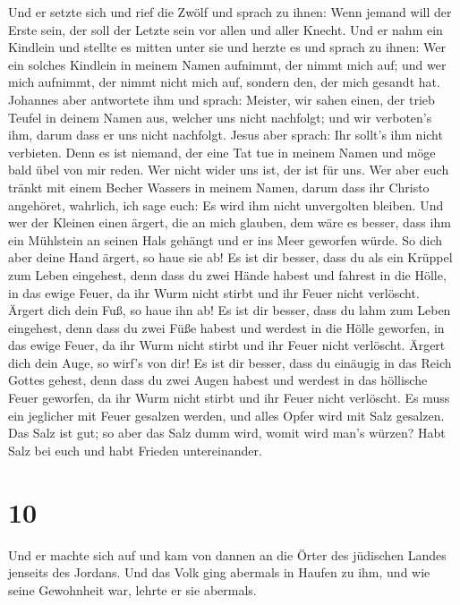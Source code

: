  Und er setzte sich und rief die Zwölf und sprach zu
ihnen: Wenn jemand will der Erste sein, der soll der Letzte sein vor
allen und aller Knecht.  Und er nahm ein Kindlein und
stellte es mitten unter sie und herzte es und sprach zu ihnen:
 Wer ein solches Kindlein in meinem Namen aufnimmt, der
nimmt mich auf; und wer mich aufnimmt, der nimmt nicht mich auf, sondern
den, der mich gesandt hat.  Johannes aber antwortete ihm
und sprach: Meister, wir sahen einen, der trieb Teufel in deinem Namen
aus, welcher uns nicht nachfolgt; und wir verboten's ihm, darum dass er
uns nicht nachfolgt.  Jesus aber sprach: Ihr sollt's ihm
nicht verbieten. Denn es ist niemand, der eine Tat tue in meinem Namen
und möge bald übel von mir reden.  Wer nicht wider uns
ist, der ist für uns.  Wer aber euch tränkt mit einem
Becher Wassers in meinem Namen, darum dass ihr Christo angehöret,
wahrlich, ich sage euch: Es wird ihm nicht unvergolten bleiben.
 Und wer der Kleinen einen ärgert, die an mich glauben,
dem wäre es besser, dass ihm ein Mühlstein an seinen Hals gehängt und er
ins Meer geworfen würde.  So dich aber deine Hand ärgert,
so haue sie ab! Es ist dir besser, dass du als ein Krüppel zum Leben
eingehest, denn dass du zwei Hände habest und fahrest in die Hölle, in
das ewige Feuer,  da ihr Wurm nicht stirbt und ihr Feuer
nicht verlöscht.  Ärgert dich dein Fuß, so haue ihn ab!
Es ist dir besser, dass du lahm zum Leben eingehest, denn dass du zwei
Füße habest und werdest in die Hölle geworfen, in das ewige Feuer,
 da ihr Wurm nicht stirbt und ihr Feuer nicht verlöscht.
 Ärgert dich dein Auge, so wirf's von dir! Es ist dir
besser, dass du einäugig in das Reich Gottes gehest, denn dass du zwei
Augen habest und werdest in das höllische Feuer geworfen,
 da ihr Wurm nicht stirbt und ihr Feuer nicht verlöscht.
 Es muss ein jeglicher mit Feuer gesalzen werden, und
alles Opfer wird mit Salz gesalzen.  Das Salz ist gut; so
aber das Salz dumm wird, womit wird man's würzen? Habt Salz bei euch und
habt Frieden untereinander.

\hypertarget{section-9}{%
\section{10}\label{section-9}}

 Und er machte sich auf und kam von dannen an die Örter
des jüdischen Landes jenseits des Jordans. Und das Volk ging abermals in
Haufen zu ihm, und wie seine Gewohnheit war, lehrte er sie abermals.

